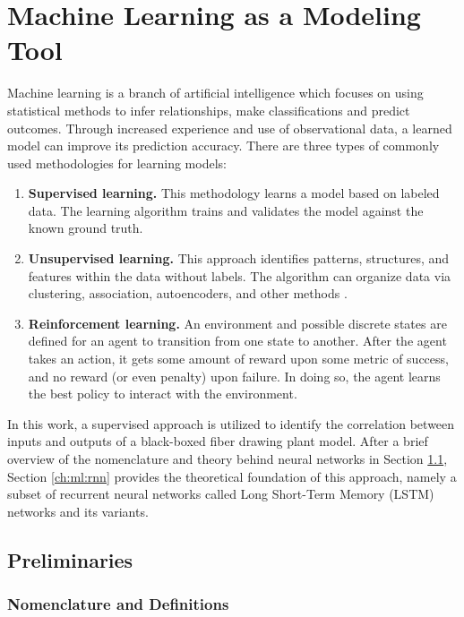 \chapter{Machine Learning as a Modeling Tool} \label{ch:ml}

Machine learning is a branch of artificial intelligence which focuses on using statistical methods to infer relationships, make classifications and predict outcomes. Through increased experience and use of observational data, a learned model can improve its prediction accuracy. There are three types of commonly used methodologies for learning models: 

\begin{enumerate}
    \item \textbf{Supervised learning.} This methodology learns a model based on labeled data. The learning algorithm trains and validates the model against the known ground truth. 
    \item \textbf{Unsupervised learning.} This approach identifies patterns, structures, and features within the data without labels. The algorithm can organize data via clustering, association, autoencoders, and other methods \cite{nvidia}.
    \item \textbf{Reinforcement learning.} An environment and possible discrete states are defined for an agent to transition from one state to another. After the agent takes an action, it gets some amount of reward upon some metric of success, and no reward (or even penalty) upon failure. In doing so, the agent learns the best policy to interact with the environment. 
\end{enumerate}

In this work, a supervised approach is utilized to identify the correlation between inputs and outputs of a black-boxed fiber drawing plant model. After a brief overview of the nomenclature and theory behind neural networks in Section \ref{ch:ml:nn}, Section \ref{ch:ml:rnn} provides the theoretical foundation of this approach, namely a subset of recurrent neural networks called Long Short-Term Memory (LSTM) networks and its variants. 

\section{Preliminaries} \label{ch:ml:nn}

\subsection{Nomenclature and Definitions} \label{ch:ml:nn:def}


